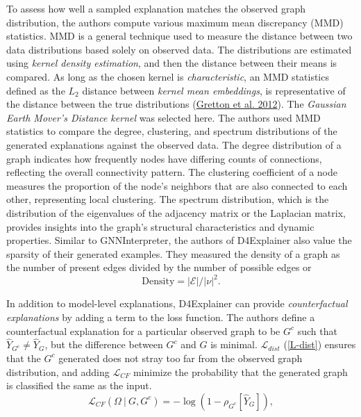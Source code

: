 \documentclass[
  11pt,
  letterpaper,
]{article}
\begin{document}
\quad To assess how well a sampled explanation matches the observed
graph distribution, the authors compute various maximum mean discrepancy
(MMD) statistics. MMD is a general technique used to measure the
distance between two data distributions based solely on observed data.
The distributions are estimated using \emph{kernel density estimation},
and then the distance between their means is compared. As long as the
chosen kernel is \emph{characteristic}, an MMD statistics defined as the
\(L_2\) distance between \emph{kernel mean embeddings}, is
representative of the distance between the true distributions
(\protect\hyperlink{ref-Gretton_Borgwardt_Rasch_Schuxf6lkopf_Smola_2012}{Gretton
et al. 2012}). The \emph{Gaussian Earth Mover's Distance kernel} was
selected here. The authors used MMD statistics to compare the degree,
clustering, and spectrum distributions of the generated explanations
against the observed data. The degree distribution of a graph indicates
how frequently nodes have differing counts of connections, reflecting
the overall connectivity pattern. The clustering coefficient of a node
measures the proportion of the node's neighbors that are also connected
to each other, representing local clustering. The spectrum distribution,
which is the distribution of the eigenvalues of the adjacency matrix or
the Laplacian matrix, provides insights into the graph's structural
characteristics and dynamic properties. Similar to GNNInterpreter, the
authors of D4Explainer also value the sparsity of their generated
examples. They measured the density of a graph as the number of present
edges divided by the number of possible edges or \begin{equation}
    \text{Density} = \mathcal{|E|} / |\nu|^2. 
\end{equation}

\quad In addition to model-level explanations, D4Explainer can provide
\emph{counterfactual explanations} by adding a term to the loss
function. The authors define a counterfactual explanation for a
particular observed graph to be \(G^c\) such that
\(\hat Y_{G^c} \neq \hat Y_G\), but the difference between \(G^c\) and
\(G\) is minimal. \(\mathcal{L}_{dist}\) (\ref{L-dist}) ensures that the
\(G^c\) generated does not stray too far from the observed graph
distribution, and adding \(\mathcal{L}_{CF}\) minimize the probability
that the generated graph is classified the same as the input.
\begin{equation}
        \mathcal{L}_{CF}(\Omega \ | \ G, G^c) = - \log(1 - \rho_{G^c}[\hat Y_{G}]), 
\end{equation}
\end{document}
